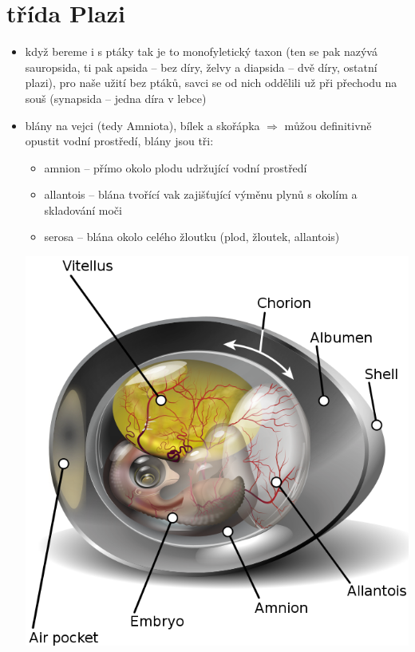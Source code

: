 \documentclass{article}
\begin{document}
\section{třída Plazi}
\begin{itemize}
  \item když bereme i s ptáky tak je to monofyletický taxon (ten se pak nazývá sauropsida, ti pak apsida -- bez díry, želvy a diapsida -- dvě díry, ostatní plazi), pro naše užití bez ptáků, savci se od nich oddělili už při přechodu na souš (synapsida -- jedna díra v lebce)
  \item blány na vejci (tedy Amniota), bílek a skořápka $\Rightarrow$ můžou definitivně opustit vodní prostředí, blány jsou tři:
  \begin{minipage}{0.8\textwidth}
    \begin{itemize}
      \item amnion -- přímo okolo plodu udržující vodní prostředí
      \item allantois -- blána tvořící vak zajišťující výměnu plynů s okolím a skladování moči
      \item serosa -- blána okolo celého žloutku (plod, žloutek, allantois)
    \end{itemize}
  \end{minipage}
  \hfill
  \noindent\begin{minipage}{0.2\textwidth}
      \includegraphics[width=\linewidth]{blany}

\end{minipage}
\end{itemize}
\end{document}
